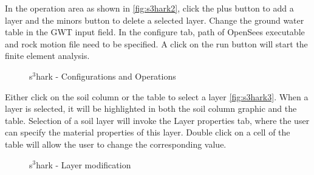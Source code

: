 In the operation area as shown in \autoref{fig:s3hark2}, click the plus button to add a layer and the minors button to delete a selected layer. 
Change the ground water table in the GWT input field. 
In the configure tab, path of OpenSees executable and rock motion file need to be specified.
A click on the run button will start the finite element analysis.


\begin{figure}[!htbp]
  \caption{s$^3$hark - Configurations and Operations }
  \label{fig:s3hark2}
\end{figure}

Either click on the soil column or the table to select a layer \autoref{fig:s3hark3}. 
When a layer is selected, it will be highlighted in both the soil column graphic and the table. 
Selection of a soil layer will invoke the Layer properties tab, where the user can specify the material properties of this layer.
Double click on a cell of the table will allow the user to change the corresponding value.

\begin{figure}[!htbp]
  \caption{s$^3$hark - Layer modification }
  \label{fig:s3hark3}
\end{figure}


